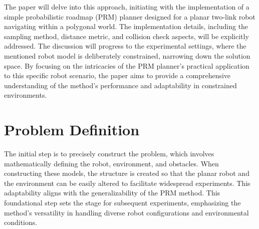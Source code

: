 \documentclass{IEEEtaes}
\begin{document}
The paper will delve into this approach, initiating with the implementation of a simple probabilistic roadmap (PRM) planner designed for a planar two-link robot navigating within a polygonal world. The implementation details, including the sampling method, distance metric, and collision check aspects, will be explicitly addressed. The discussion will progress to the experimental settings, where the mentioned robot model is deliberately constrained, narrowing down the solution space. By focusing on the intricacies of the PRM planner's practical application to this specific robot scenario, the paper aims to provide a comprehensive understanding of the method's performance and adaptability in constrained environments.

\section{\large \textbf{Problem Definition}}

\begin{figure}[t!]
    \centering
    \vspace{0.5em}
\end{figure}

The initial step is to precisely construct the problem, which involves mathematically defining the robot, environment, and obstacles. When constructing these models, the structure is created so that the planar robot and the environment can be easily altered to facilitate widespread experiments. This adaptability aligns with the generalizability of the PRM method. This foundational step sets the stage for subsequent experiments, emphasizing the method's versatility in handling diverse robot configurations and environmental conditions.

\end{document}
